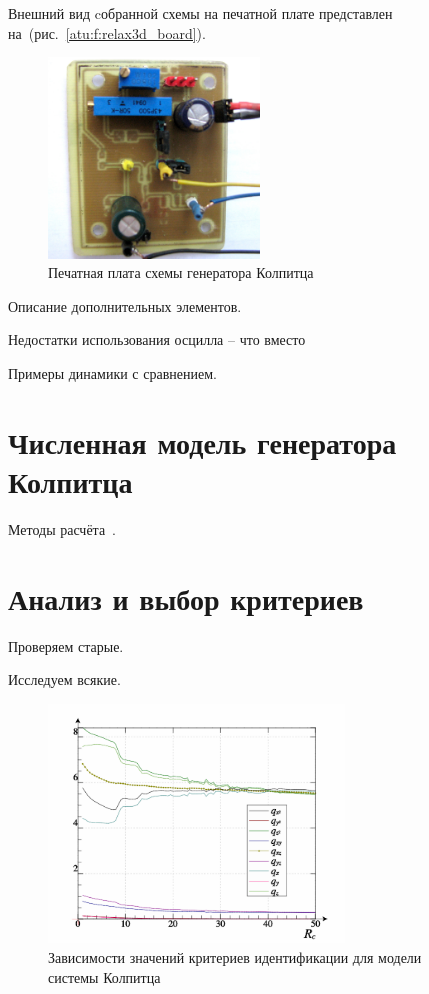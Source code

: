 Внешний вид cобранной схемы на печатной плате представлен на~(рис.~\ref{atu:f:relax3d_board}).

\begin{figure}[htb!]
\centerline{\includegraphics[width=0.5\textwidth]{p/colp_board.jpg} }
\caption{Печатная плата схемы генератора Колпитца}
\label{atu:f:colp_board}
\end{figure}


Описание дополнительных элементов.

Недостатки использования осцилла -- что вместо

Примеры динамики с сравнением.

\section{Численная модель генератора Колпитца}

Методы расчёта~\cite{zaeplnii_radio_calc}.

\section{Анализ и выбор критериев}

Проверяем старые.

Исследуем всякие.

\begin{figure}[htb!]
\centerline{\includegraphics[width=0.7\textwidth]{p/colp_bjt_q-p_Rc_q.png} }
\caption{Зависимости значений критериев идентификации для модели системы Колпитца}
\label{atu:f:colp_bjt_q-p_Rc_q}
\end{figure}


